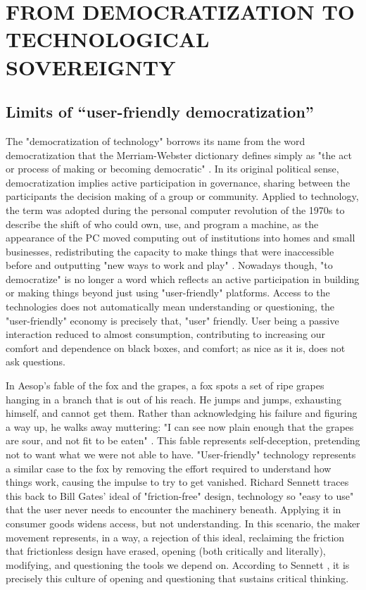 \documentclass{article}
\begin{document}
\section{FROM DEMOCRATIZATION TO TECHNOLOGICAL SOVEREIGNTY}

\subsection{Limits of “user-friendly democratization”}

The "democratization of technology" borrows its name from the word democratization that the Merriam-Webster dictionary defines simply as "the act or process of making or becoming democratic" \cite{mw_democratization}. In its original political sense, democratization implies active participation in governance, sharing between the participants the decision making of a group or community. Applied to technology, the term was adopted during the personal computer revolution of the 1970s to describe the shift of who could own, use, and program a machine, as the appearance of the PC moved computing out of institutions into homes and small businesses, redistributing the capacity to make things that were inaccessible before and outputting "new ways to work and play" \cite{gershenfeld2005fab}. Nowadays though, "to democratize" is no longer a word which reflects an active participation in building or making things beyond just using "user-friendly" platforms. Access to the technologies does not automatically mean understanding or questioning, the "user-friendly" economy is precisely that, "user" friendly. User being a passive interaction reduced to almost consumption, contributing to increasing our comfort and dependence on black boxes, and comfort; as nice as it is, does not ask questions.

In Aesop's fable of the fox and the grapes, a fox spots a set of ripe grapes hanging in a branch that is out of his reach. He jumps and jumps, exhausting himself, and cannot get them. Rather than acknowledging his failure and figuring a way up, he walks away muttering: "I can see now plain enough that the grapes are sour, and not fit to be eaten" \cite{godwin1818fables}. This fable represents self-deception, pretending not to want what we were not able to have. "User-friendly" technology represents a similar case to the fox by removing the effort required to understand how things work, causing the impulse to try to get vanished. Richard Sennett \cite{sennett2019construir} traces this back to Bill Gates' ideal of "friction-free" design, technology so "easy to use" that the user never needs to encounter the machinery beneath. Applying it in consumer goods widens access, but not understanding. In this scenario, the maker movement represents, in a way, a rejection of this ideal, reclaiming the friction that frictionless design have erased, opening (both critically and literally), modifying, and questioning the tools we depend on. According to Sennett \cite{sennett2019construir}, it is precisely this culture of opening and questioning that sustains critical thinking.
\end{document}
